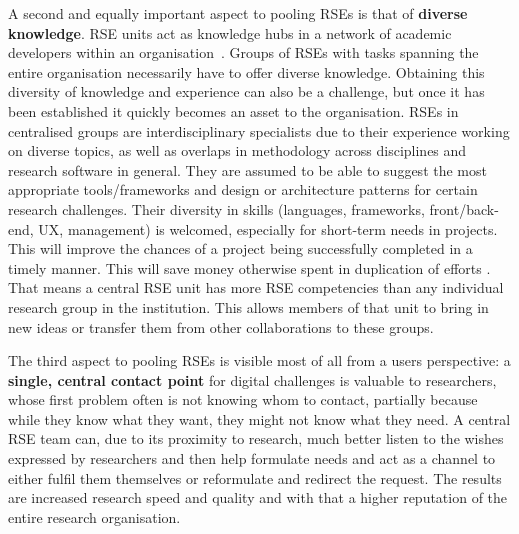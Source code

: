 \documentclass[a4paper]{article}
\begin{document}
A second and equally important aspect to pooling RSEs is that of \textbf{diverse knowledge}.
RSE units act as knowledge hubs in a network of academic developers within an organisation~\autocite{Elsholz2006}.
Groups of RSEs with tasks spanning the entire organisation necessarily have to offer diverse knowledge.
Obtaining this diversity of knowledge and experience can also be a challenge, but once it has been established it quickly becomes an asset to the organisation.
RSEs in centralised groups are interdisciplinary specialists due to their experience working on diverse topics,  as well as overlaps in methodology across disciplines and research software in general.
They are assumed to be able to suggest the most appropriate tools/frameworks and design or architecture patterns for certain research challenges.
Their diversity in skills (languages, frameworks, front/back-end, UX, management) is welcomed, especially for short-term needs in projects.
This will improve the chances of a project being successfully completed in a timely manner.
This will save money otherwise spent in duplication of efforts . 
That means a central RSE unit has more RSE competencies than any individual research group in the institution.
This allows members of that unit to bring in new ideas or transfer them from other collaborations to these groups.

The third aspect to pooling RSEs is visible most of all from a users perspective: a \textbf{single, central contact point} for digital challenges is valuable to researchers, whose first problem often is not knowing whom to contact, partially because while they know what they want, they might not know what they need.
A central RSE team can, due to its proximity to research, much better listen to the wishes expressed by researchers and then help formulate needs and act as a channel to either fulfil them themselves or reformulate and redirect the request.
The results are increased research speed and quality and with that a higher reputation of the entire research organisation.

\end{document}
